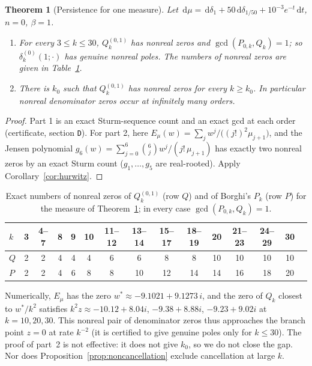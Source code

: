 \documentclass[11pt,a4paper]{article}
\newtheorem{theorem}{Theorem}[section]
\theoremstyle{definition}
\theoremstyle{remark}
\newcommand{\dd}{\,\mathrm{d}}
\begin{document}
\begin{theorem}[Persistence for one measure]\label{thm:persist}
Let $\dd\mu=\dd\delta_1+50\dd\delta_{1/50}+10^{-3}e^{-t}\dd t$, $n=0$, $\beta=1$.
\begin{enumerate}
\item For every $3\le k\le30$, $Q_k^{(0,1)}$ has nonreal zeros and
$\gcd(P_{0,k},Q_k)=1$; so $\delta_k^{(0)}(1;\cdot)$ has genuine nonreal poles.
The numbers of nonreal zeros are given in Table~\ref{tab:persist}.
\item There is $k_0$ such that $Q_k^{(0,1)}$ has nonreal zeros for every
$k\ge k_0$. In particular nonreal denominator zeros occur at infinitely
many orders.
\end{enumerate}
\end{theorem}
\begin{proof}
Part 1 is an exact Sturm-sequence count and an exact gcd at each order
(certificate, section \texttt{D}). For part 2, here
$E_\mu(w)=\sum_j w^j/\bigl((j!)^2\mu_{j+1}\bigr)$, and the Jensen polynomial
$g_6(w)=\sum_{j=0}^6\binom6jw^j/(j!\,\mu_{j+1})$ has exactly two nonreal
zeros by an exact Sturm count ($g_1,\dots,g_5$ are real-rooted). Apply
Corollary~\ref{cor:hurwitz}.
\end{proof}

\begin{table}[htbp]
\centering
\caption{Exact numbers of nonreal zeros of $Q_k^{(0,1)}$ (row $Q$) and of
Borghi's $P_k$ (row $P$) for the measure of Theorem~\ref{thm:persist}; in
every case $\gcd(P_{0,k},Q_k)=1$.}
\label{tab:persist}
\scriptsize
\setlength{\tabcolsep}{3.2pt}
\begin{tabular}{@{}l*{14}{c}@{}}
\toprule
$k$ & 3 & 4--7 & 8 & 9 & 10 & 11--12 & 13--14 & 15--17 & 18--19 & 20 & 21--23 & 24--29 & 30\\
\midrule
$Q$ & 2 & 2 & 4 & 4 & 4 & 6 & 6 & 8 & 8 & 10 & 10 & 10 & 10\\
$P$ & 2 & 2 & 4 & 6 & 8 & 8 & 10 & 12 & 14 & 14 & 16 & 18 & 20\\
\bottomrule
\end{tabular}
\end{table}

Numerically, $E_\mu$ has the zero $w^*\approx-9.1021+9.1273\,i$, and the
zero of $Q_k$ closest to $w^*/k^2$ satisfies $k^2z\approx-10.12+8.04i$,
$-9.38+8.88i$, $-9.23+9.02i$ at $k=10,20,30$. This nonreal pair of
denominator zeros thus approaches the branch point $z=0$ at rate $k^{-2}$
(it is certified to give genuine poles only for $k\le30$). The proof of part~2 is
not effective: it does not give $k_0$, so we do not close the gap. Nor does
Proposition~\ref{prop:noncancellation} exclude cancellation at large $k$.
\end{document}
